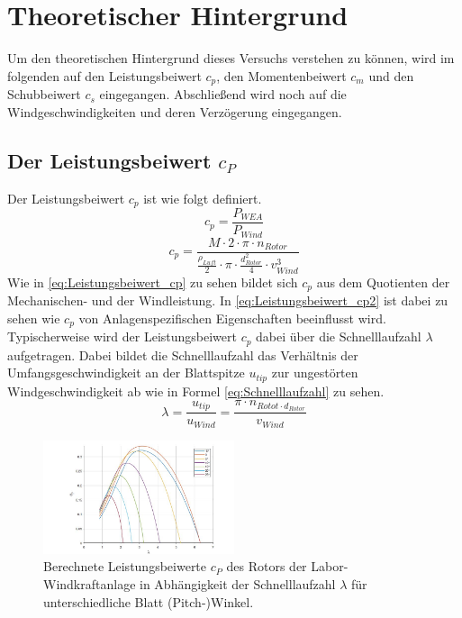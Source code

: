 \section{Theoretischer Hintergrund}
Um den theoretischen Hintergrund dieses Versuchs verstehen zu können, wird im folgenden auf den Leistungsbeiwert $c_{p}$, den Momentenbeiwert $c_{m}$ und den Schubbeiwert $c_{s}$ eingegangen. Abschließend wird noch auf die Windgeschwindigkeiten und deren Verzögerung eingegangen.
\subsection{Der Leistungsbeiwert \texorpdfstring{$c_P$}{}}
Der Leistungsbeiwert $c_{p}$ ist wie folgt definiert.
\begin{equation}
  c_{p}= \frac{P_{WEA}}{P_{Wind}}
    \label{eq:Leistungsbeiwert_cp}
\end{equation}
\begin{equation}
  c_{p}= \frac{M \cdot 2 \cdot \pi \cdot n_{Rotor}}{\frac{\rho_{Luft}}{2}\cdot \pi \cdot \frac{d^2_{Rotor}}{4} \cdot v^3_{Wind} }
    \label{eq:Leistungsbeiwert_cp2}
\end{equation}
Wie in \autoref{eq:Leistungsbeiwert_cp} zu sehen bildet sich $c_{p}$ aus dem Quotienten der Mechanischen- und der Windleistung. 
In \autoref{eq:Leistungsbeiwert_cp2} ist dabei zu sehen wie $c_{p}$ von Anlagenspezifischen Eigenschaften beeinflusst wird.
Typischerweise wird der Leistungsbeiwert $c_{p}$ dabei über die Schnelllaufzahl $\lambda$ aufgetragen. Dabei bildet die Schnelllaufzahl das Verhältnis der Umfangsgeschwindigkeit an der Blattspitze $u_{tip}$ zur ungestörten Windgeschwindigkeit ab wie in Formel \ref{eq:Schnelllaufzahl} zu sehen.
\begin{equation}
\lambda=\frac{u_{tip}}{u_{Wind}}=\frac{\pi \cdot n_{Rotot \cdot d_{Rotor}}}{v_{Wind}}
    \label{eq:Schnelllaufzahl}
\end{equation}

\begin{figure}[h!]
    \centering
    \includegraphics[width=0.5\textwidth]{Abbildungen/cpzulambda.jpg}
    \caption{Berechnete Leistungsbeiwerte $c_{P}$ des Rotors der Labor-Windkraftanlage in Abhängigkeit der Schnelllaufzahl $\lambda$ für unterschiedliche Blatt (Pitch-)Winkel.}
    \label{fig:cpzulambda}
\end{figure}

